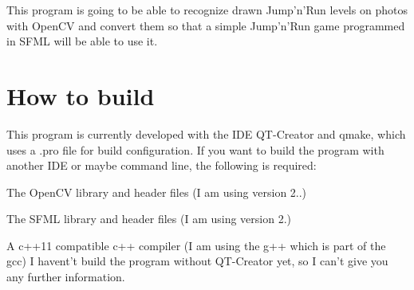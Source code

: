 This program is going to be able to recognize drawn Jump'n'Run levels on photos with Open\-C\-V and convert them so that a simple Jump'n'Run game programmed in S\-F\-M\-L will be able to use it.

\section*{How to build}

This program is currently developed with the I\-D\-E Q\-T-\/\-Creator and qmake, which uses a .pro file for build configuration. If you want to build the program with another I\-D\-E or maybe command line, the following is required\-:
\begin{DoxyItemize}
\item The Open\-C\-V library and header files (I am using version 2..)
\item The S\-F\-M\-L library and header files (I am using version 2.)
\item A c++11 compatible c++ compiler (I am using the g++ which is part of the gcc) I havent't build the program without Q\-T-\/\-Creator yet, so I can't give you any further information. 
\end{DoxyItemize}